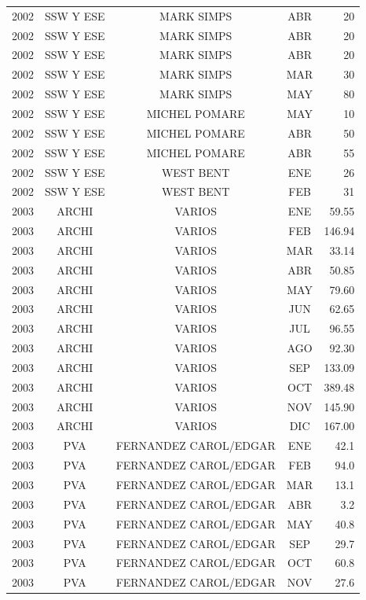 \documentclass[12pt,]{article}
\begin{document}
\begin{table}[ht]
{\begin{tabular}{lcccr}
  2002 & SSW Y ESE & MARK SIMPS & ABR & 20 \\ 
  2002 & SSW Y ESE & MARK SIMPS & ABR & 20 \\ 
  2002 & SSW Y ESE & MARK SIMPS & ABR & 20 \\ 
  2002 & SSW Y ESE & MARK SIMPS & MAR & 30 \\ 
  2002 & SSW Y ESE & MARK SIMPS & MAY & 80 \\ 
  2002 & SSW Y ESE & MICHEL POMARE & MAY & 10 \\ 
  2002 & SSW Y ESE & MICHEL POMARE & ABR & 50 \\ 
  2002 & SSW Y ESE & MICHEL POMARE & ABR & 55 \\ 
  2002 & SSW Y ESE & WEST BENT & ENE & 26 \\ 
  2002 & SSW Y ESE & WEST BENT & FEB & 31 \\ 
  2003 & ARCHI & VARIOS & ENE & 59.55 \\ 
  2003 & ARCHI & VARIOS & FEB & 146.94 \\ 
  2003 & ARCHI & VARIOS & MAR & 33.14 \\ 
  2003 & ARCHI & VARIOS & ABR & 50.85 \\ 
  2003 & ARCHI & VARIOS & MAY & 79.60 \\ 
  2003 & ARCHI & VARIOS & JUN & 62.65 \\ 
  2003 & ARCHI & VARIOS & JUL & 96.55 \\ 
  2003 & ARCHI & VARIOS & AGO & 92.30 \\ 
  2003 & ARCHI & VARIOS & SEP & 133.09 \\ 
  2003 & ARCHI & VARIOS & OCT & 389.48 \\ 
  2003 & ARCHI & VARIOS & NOV & 145.90 \\ 
  2003 & ARCHI & VARIOS & DIC & 167.00 \\ 
  2003 & PVA & FERNANDEZ CAROL/EDGAR & ENE & 42.1 \\ 
  2003 & PVA & FERNANDEZ CAROL/EDGAR & FEB & 94.0 \\ 
  2003 & PVA & FERNANDEZ CAROL/EDGAR & MAR & 13.1 \\ 
  2003 & PVA & FERNANDEZ CAROL/EDGAR & ABR & 3.2 \\ 
  2003 & PVA & FERNANDEZ CAROL/EDGAR & MAY & 40.8 \\ 
  2003 & PVA & FERNANDEZ CAROL/EDGAR & SEP & 29.7 \\ 
  2003 & PVA & FERNANDEZ CAROL/EDGAR & OCT & 60.8 \\ 
  2003 & PVA & FERNANDEZ CAROL/EDGAR & NOV & 27.6 \\ 

\end{tabular}}
\end{table}
\end{document}
